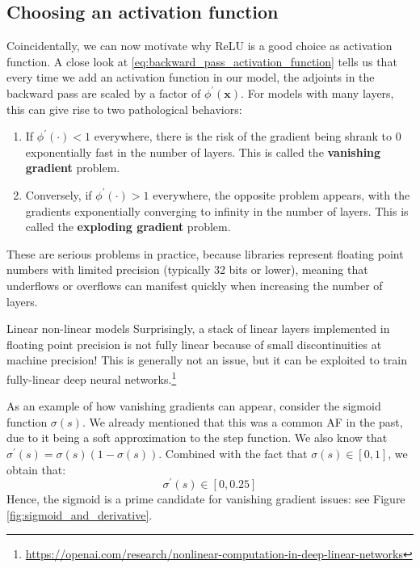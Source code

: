 \subsection{Choosing an activation function}

Coincidentally, we can now motivate why ReLU is a good choice as activation function. A close look at \eqref{eq:backward_pass_activation_function} tells us that every time we add an activation function in our model, the adjoints in the backward pass are scaled by a factor of $\phi^\prime(\mathbf{x})$. For models with many layers, this can give rise to two pathological behaviors:

\begin{enumerate}
\item If $\phi^\prime(\cdot) < 1$ everywhere, there is the risk of the gradient being shrank to 0 exponentially fast in the number of layers. This is called the \textbf{vanishing gradient} problem.
\item Conversely, if $\phi^\prime(\cdot) > 1$ everywhere, the opposite problem appears, with the gradients exponentially converging to infinity in the number of layers. This is called the \textbf{exploding gradient} problem.
\end{enumerate}

These are serious problems in practice, because libraries represent floating point numbers with limited precision (typically 32 bits or lower), meaning that underflows or overflows can manifest quickly when increasing the number of layers.

\begin{supportbox}{Linear non-linear models}
Surprisingly, a stack of linear layers implemented in floating point precision is not fully linear because of small discontinuities at machine precision! This is generally not an issue, but it can be exploited to train fully-linear deep neural networks.\footnote{\url{https://openai.com/research/nonlinear-computation-in-deep-linear-networks}}
\end{supportbox}

As an example of how vanishing gradients can appear, consider the sigmoid function $\sigma(s)$. We already mentioned that this was a common AF in the past, due to it being a soft approximation to the step function. We also know that $\sigma^\prime(s)=\sigma(s)(1-\sigma(s))$. Combined with the fact that $\sigma(s) \in \left[0,1\right]$, we obtain that:
%
$$
\sigma^\prime(s)\in\left[0,0.25\right]
$$
%
Hence, the sigmoid is a prime candidate for vanishing gradient issues: see Figure \ref{fig:sigmoid_and_derivative}.

